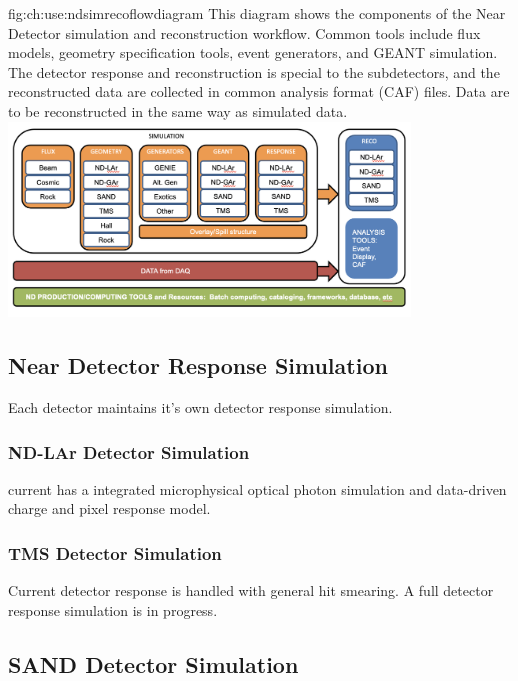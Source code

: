 \documentclass[../main-v1.tex]{subfiles}
\begin{document}
\begin{dunefigure}
{fig:ch:use:ndsimrecoflowdiagram}
{This diagram shows the components of the Near Detector simulation and reconstruction workflow.  Common tools include flux models, geometry specification tools, event generators, and GEANT simulation.  The detector response and reconstruction is special to the subdetectors, and the reconstructed data are collected in common analysis format (CAF) files.  Data are to be reconstructed in the same way as simulated data.}
\includegraphics[width=0.8\textwidth]{graphics/Algo/ND_sim_reco_flowdiagram.png}
\end{dunefigure}

\subsection{Near Detector Response Simulation}

Each detector maintains it's own detector response simulation. 

\subsubsection{ND-LAr Detector Simulation}
 current has a integrated microphysical optical photon simulation and data-driven charge and pixel response model. 

\subsubsection{TMS Detector Simulation}
Current detector response is handled with general hit smearing. A full detector response simulation is in progress. 

\subsection{SAND Detector Simulation}
\label{sec:usecases_sanddetesim}
\end{document}
